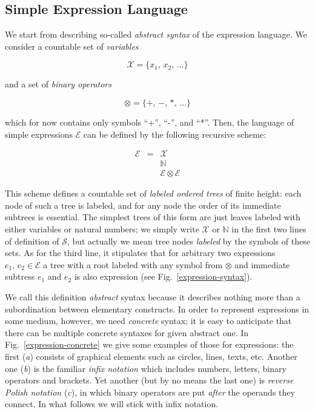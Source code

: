 \documentclass{article}
\begin{document}
\subsection{Simple Expression Language}

We start from describing so-called \emph{abstract syntax} of the expression language. We consider a countable set of \emph{variables}

\[
\mathscr{X}=\{x_1,\,x_2,\,\dots\}
\]

and a set of \emph{binary operators}

\[
\otimes=\{+,\,-,\,*,\,\dots\}
\]

which for now contains only symbols ``+'', ``-'', and ``*''. Then, the language of simple expressions $\mathcal{E}$ can be defined by
the following recursive scheme:

\[
\begin{array}{rcl}
  \mathscr{E} & = & \mathscr{X} \\
              &   & \mathbb{N} \\
              &   & \mathscr{E}\otimes\mathscr{E}
\end{array}
\]

This scheme defines a countable set of \emph{labeled ordered trees} of finite height: each node of such a tree is labeled, and for any node the order
of its immediate subtrees is essential. The simplest trees of this form are just leaves labeled with either variables or natural numbers; we simply
write $\mathcal{X}$ or $\mathbb{N}$ in the first two lines of definition of $\mathcal{S}$, but actually we mean tree nodes \emph{labeled} by the symbols of
these sets. As for the third line, it stipulates that for arbitrary two expressions $e_1,\,e_2\in\mathscr{E}$ a tree with a root labeled with any symbol
from $\otimes$ and immediate subtress $e_1$ and $e_2$ is also expression (see Fig.~\ref{expression-syntax}).

We call this definition \emph{abstract} syntax because it describes nothing more than a subordination between elementary constructs. In order to represent
expressions in some medium, however, we need \emph{concrete} syntax; it is easy to anticipate that there can be multiple concrete syntaxes for given
abstract one. In Fig.~\ref{expression-concrete} we give some examples of those for expressions: the first (\emph{a}) consists of graphical elements such as
circles, lines, texts, etc. Another one (\emph{b}) is the familiar \emph{infix notation} which includes numbers, letters, binary
operators and brackets. Yet another (but by no means the last one) is \emph{reverse Polish notation} (\emph{c}), in which binary operators are
put \emph{after} the operands they connect. In what follows we will stick with infix notation.
\end{document}
